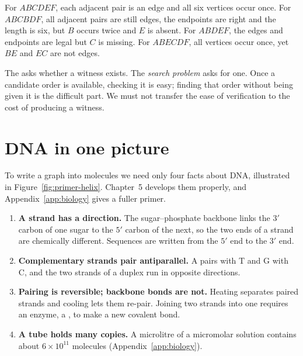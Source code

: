 For $ABCDEF$, each adjacent pair is an edge and all six vertices occur once. For
$ABCBDF$, all adjacent pairs are still edges, the endpoints are right and the
length is six, but $B$ occurs twice and $E$ is absent. For $ABDEF$, the edges
and endpoints are legal but $C$ is missing. For $ABECDF$, all vertices occur
once, yet $BE$ and $EC$ are not edges.

The  asks whether a witness exists. The \emph{search
problem} asks for one. Once a candidate order is available, checking it is
easy; finding that order without being given it is the difficult part. We must
not transfer the ease of verification to the cost of producing a witness.

\section{DNA in one picture}\label{sec:primer}
To write a graph into molecules we need only four facts about DNA, illustrated
in Figure~\ref{fig:primer-helix}. Chapter~5 develops them properly, and
Appendix~\ref{app:biology} gives a fuller primer.


\begin{enumerate}
\item \textbf{A strand has a direction.} The sugar--phosphate backbone links the
$3'$ carbon of one sugar to the $5'$ carbon of the next, so the two ends of a
strand are chemically different. Sequences are written from the $5'$ end to
the $3'$ end.
\item \textbf{Complementary strands pair antiparallel.} A pairs with T and G with
C, and the two strands of a duplex run in opposite directions.\cite{WatsonCrick1953,Alberts2002}
\item \textbf{Pairing is reversible; backbone bonds are not.} Heating separates
paired strands and cooling lets them re-pair. Joining two strands into one
requires an enzyme, a , to make a new covalent bond.
\item \textbf{A tube holds many copies.} A microlitre of a micromolar solution
contains about $6\times10^{11}$ molecules (Appendix~\ref{app:biology}).
\end{enumerate}

